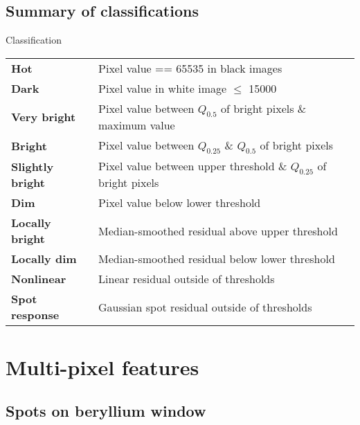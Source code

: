 \documentclass[8pt]{beamer}
\newcommand{\todo}[1]{
	\begin{minipage}{\textwidth}
	\begin{footnotesize}
	\textcolor{purple}{
					\begin{tabular}{p{0.01\textwidth}p{0.95\textwidth}}
						$\bullet$ & #1
					\end{tabular}
					}
	\end{footnotesize}
	\end{minipage}
}
\begin{document}
\subsection{Summary of classifications}

\begin{frame}{Classification} 

	
	\begin{tabular}{p{}p{}}
		\textbf{Hot} & Pixel value == 65535 in black images\\
		\textbf{Dark} & Pixel value in white image $\leq$ 15000\\
		\textbf{Very bright} & Pixel value between $Q_{0.5}$ of bright pixels \& maximum value\\
		\textbf{Bright} & Pixel value between $Q_{0.25}$ \& $Q_{0.5}$ of bright pixels\\
		\textbf{Slightly bright} & Pixel value between upper threshold \& $Q_{0.25}$ of bright pixels\\
		\textbf{Dim} & Pixel value below lower threshold\\
		\textbf{Locally bright} & Median-smoothed residual above upper threshold\\
		\textbf{Locally dim} & Median-smoothed residual below lower threshold\\
		\textbf{Nonlinear} & Linear residual outside of thresholds\\
		\textbf{Spot response} & Gaussian spot residual outside of thresholds
	\end{tabular}

\end{frame}



\section{Multi-pixel features}

\subsection{Spots on beryllium window}
\end{document}
